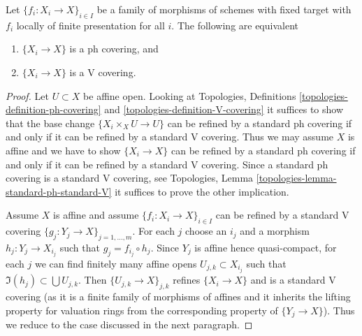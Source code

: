 \begin{lemma}
\label{lemma-equivalence-h-v-locally-finite-presentation}
Let $\{f_i : X_i \to X\}_{i \in I}$ be a family of morphisms
of schemes with fixed target with $f_i$ locally of finite
presentation for all $i$. The following are equivalent
\begin{enumerate}
\item $\{X_i \to X\}$ is a ph covering, and
\item $\{X_i \to X\}$ is a V covering.
\end{enumerate}
\end{lemma}

\begin{proof}
Let $U \subset X$ be affine open. Looking at
Topologies, Definitions \ref{topologies-definition-ph-covering}
and \ref{topologies-definition-V-covering} it suffices to show that
the base change $\{X_i \times_X U \to U\}$ can be refined
by a standard ph covering if and only if it can be refined by
a standard V covering. Thus we may assume $X$ is affine and we have to show
$\{X_i \to X\}$ can be refined by a standard ph covering
if and only if it can be refined by a standard V covering.
Since a standard ph covering is a standard V covering, see
Topologies, Lemma \ref{topologies-lemma-standard-ph-standard-V}
it suffices to prove the other implication.

\medskip\noindent
Assume $X$ is affine and assume $\{f_i : X_i \to X\}_{i \in I}$
can be refined by a standard V covering
$\{g_j : Y_j \to X\}_{j = 1, \ldots, m}$.
For each $j$ choose an $i_j$ and a morphism
$h_j : Y_j \to X_{i_j}$ such that $g_j = f_{i_j} \circ h_j$.
Since $Y_j$ is affine hence quasi-compact,
for each $j$ we can find finitely many affine opens
$U_{j, k} \subset X_{i_j}$ such that $\Im(h_j) \subset \bigcup U_{j, k}$.
Then $\{U_{j, k} \to X\}_{j, k}$ refines $\{X_i \to X\}$
and is a standard V covering (as it is a finite family of morphisms
of affines and it inherits the lifting property for valuation rings
from the corresponding property of $\{Y_j \to X\}$).
Thus we reduce to the case discussed in the next paragraph.


\end{proof}
